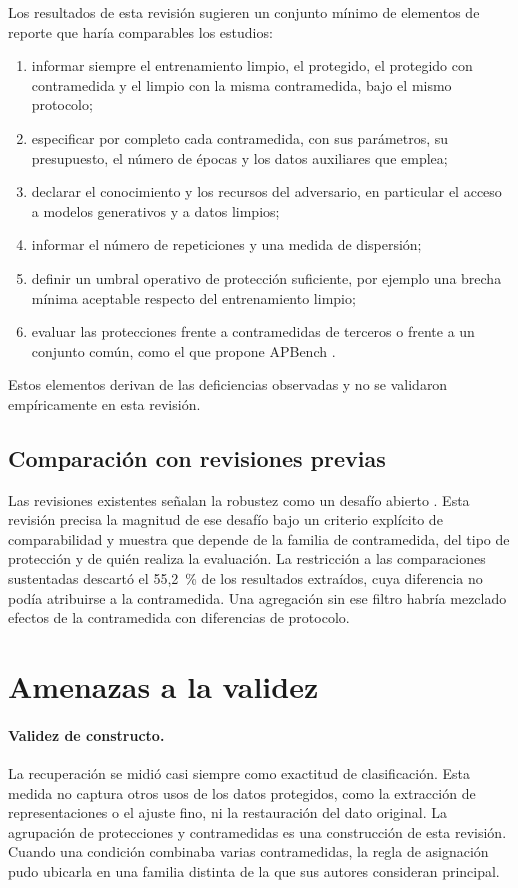 Los resultados de esta revisión sugieren un conjunto mínimo de elementos de reporte que haría comparables los estudios:
\begin{enumerate}
\item informar siempre el entrenamiento limpio, el protegido, el protegido con contramedida y el limpio con la misma contramedida, bajo el mismo protocolo;
\item especificar por completo cada contramedida, con sus parámetros, su presupuesto, el número de épocas y los datos auxiliares que emplea;
\item declarar el conocimiento y los recursos del adversario, en particular el acceso a modelos generativos y a datos limpios;
\item informar el número de repeticiones y una medida de dispersión;
\item definir un umbral operativo de protección suficiente, por ejemplo una brecha mínima aceptable respecto del entrenamiento limpio;
\item evaluar las protecciones frente a contramedidas de terceros o frente a un conjunto común, como el que propone APBench \cite{S0111}.
\end{enumerate}
Estos elementos derivan de las deficiencias observadas y no se validaron empíricamente en esta revisión.

\subsection{Comparación con revisiones previas}

Las revisiones existentes señalan la robustez como un desafío abierto \cite{li2025survey,zhang2026sok}. Esta revisión precisa la magnitud de ese desafío bajo un criterio explícito de comparabilidad y muestra que depende de la familia de contramedida, del tipo de protección y de quién realiza la evaluación. La restricción a las comparaciones sustentadas descartó el 55,2~\% de los resultados extraídos, cuya diferencia no podía atribuirse a la contramedida. Una agregación sin ese filtro habría mezclado efectos de la contramedida con diferencias de protocolo.

\section{Amenazas a la validez}\label{sec:amenazas}

\paragraph{Validez de constructo.} La recuperación se midió casi siempre como exactitud de clasificación. Esta medida no captura otros usos de los datos protegidos, como la extracción de representaciones o el ajuste fino, ni la restauración del dato original. La agrupación de protecciones y contramedidas es una construcción de esta revisión. Cuando una condición combinaba varias contramedidas, la regla de asignación pudo ubicarla en una familia distinta de la que sus autores consideran principal.

